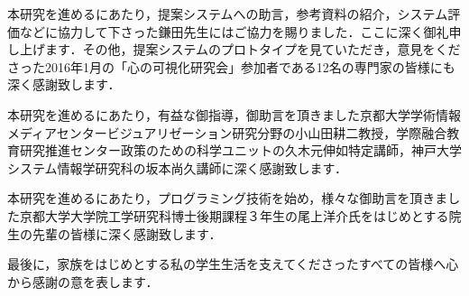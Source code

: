 本研究を進めるにあたり，提案システムへの助言，参考資料の紹介，システム評価などに協力して下さった鎌田先生にはご協力を賜りました．ここに深く御礼申し上げます．その他，提案システムのプロトタイプを見ていただき，意見をくださった2016年1月の「心の可視化研究会」参加者である12名の専門家の皆様にも深く感謝致します．

本研究を進めるにあたり，有益な御指導，御助言を頂きました京都大学学術情報メディアセンタービジュアリゼーション研究分野の小山田耕二教授，学際融合教育研究推進センター政策のための科学ユニットの久木元伸如特定講師，神戸大学 システム情報学研究科の坂本尚久講師に深く感謝致します．

本研究を進めるにあたり，プログラミング技術を始め，様々な御助言を頂きました京都大学大学院工学研究科博士後期課程３年生の尾上洋介氏をはじめとする院生の先輩の皆様に深く感謝致します．

最後に，家族をはじめとする私の学生生活を支えてくださったすべての皆様へ心から感謝の意を表します．